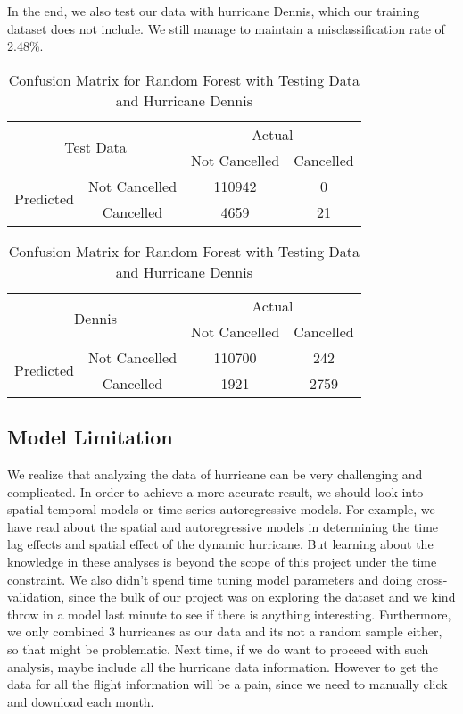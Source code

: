 In the end, we also test our data with hurricane Dennis, which our training dataset does not include. We still manage to maintain a misclassification rate of 2.48\%. \\


\begin{table}[H]
\centering
\begin{subtable}{.5\textwidth}
\centering
\begin{tabular}{@{}|c|c|c|c|@{}}
\toprule
\multicolumn{2}{|c|}{\multirow{2}{*}{Test Data}} & \multicolumn{2}{c|}{Actual} \\ \cmidrule(l){3-4} 
\multicolumn{2}{|c|}{}                        & Not Cancelled          & Cancelled         \\ \midrule
\multirow{2}{*}{Predicted}       & Not Cancelled        & 110942        & 0 \\ \cmidrule(l){2-4} 
                                 & Cancelled       & 4659         & 21        \\ \bottomrule
\end{tabular}

\begin{tabular}{@{}|c|c|c|c|@{}}
\toprule
\multicolumn{2}{|c|}{\multirow{2}{*}{Dennis}} & \multicolumn{2}{c|}{Actual} \\ \cmidrule(l){3-4} 
\multicolumn{2}{|c|}{}                        & Not Cancelled         &  Cancelled         \\ \midrule
\multirow{2}{*}{Predicted}       & Not Cancelled       & 110700   	  & 242 \\ \cmidrule(l){2-4} 
                                 & Cancelled       & 1921 		  & 2759 \\ \bottomrule
\end{tabular}
\end{subtable}
\caption{Confusion Matrix for Random Forest with Testing Data and Hurricane Dennis}
\label{Confusion_MLP}
\end{table}

\subsection{Model Limitation} 
We realize that analyzing the data of hurricane can be very challenging and complicated. In order to achieve a more accurate result, we should look into spatial-temporal models or time series autoregressive models. For example, we have read about the spatial and autoregressive models in determining the time lag effects and spatial effect of the dynamic hurricane. But learning about the knowledge in these analyses is beyond the scope of this project under the time constraint. We also didn't spend time tuning model parameters and doing cross-validation, since the bulk of our project was on exploring the dataset and we kind throw in a model last minute to see if there is anything interesting. Furthermore, we only combined 3 hurricanes as our data and its not a random sample either, so that might be problematic. Next time, if we do want to proceed with such analysis, maybe include all the hurricane data information. However to get the data for all the flight information will be a pain, since we need to manually click and download each month.
